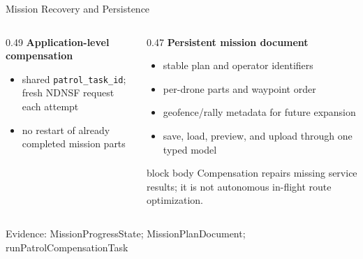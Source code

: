 \documentclass[aspectratio=169]{beamer}
\newcommand{\bluebox}[1]{%
  \begin{beamercolorbox}[rounded=true,shadow=false,sep=0.65em,wd=0.94\linewidth]{block body}
  #1
  \end{beamercolorbox}
}
\newcommand{\evidence}[1]{%
  \vfill\par\noindent
  \begin{minipage}{\linewidth}
  \raggedright{\color{SoftGray}\tiny Evidence: #1}\par
  \end{minipage}
}
\begin{document}
\begin{frame}{Mission Recovery and Persistence}
\footnotesize
\begin{columns}[T]
\begin{column}{0.49\textwidth}
\textbf{Application-level compensation}
\begin{center}
\end{center}
\begin{itemize}
  \item shared \texttt{patrol\_task\_id}; fresh NDNSF request each attempt
  \item no restart of already completed mission parts
\end{itemize}
\end{column}
\begin{column}{0.47\textwidth}
\textbf{Persistent mission document}
\begin{itemize}
  \item stable plan and operator identifiers
  \item per-drone parts and waypoint order
  \item geofence/rally metadata for future expansion
  \item save, load, preview, and upload through one typed model
\end{itemize}

\bluebox{Compensation repairs missing service results; it is not autonomous in-flight route optimization.}
\end{column}
\end{columns}
\evidence{MissionProgressState; MissionPlanDocument; runPatrolCompensationTask}
\end{frame}
\end{document}
